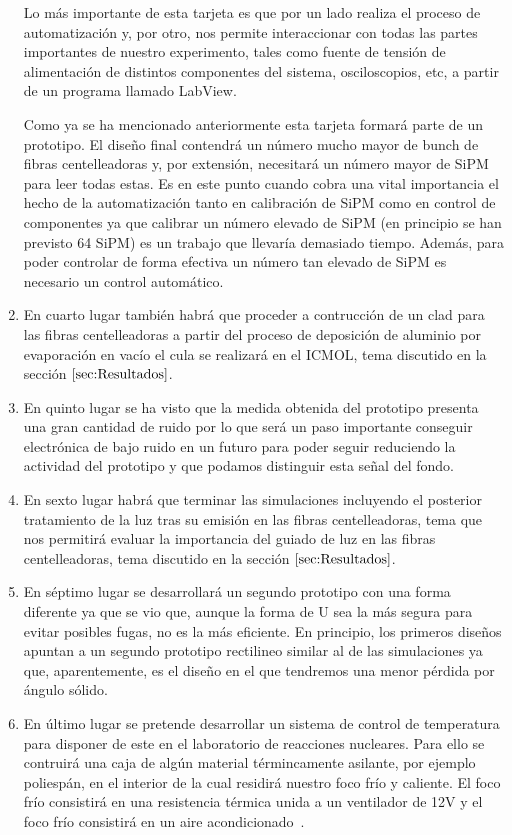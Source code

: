 \begin{enumerate}
Lo más importante de esta tarjeta es que por un lado realiza el proceso de automatización y, por otro, nos permite interaccionar con todas las partes importantes de nuestro experimento, tales como fuente de tensión de alimentación de distintos componentes del sistema, osciloscopios, etc, a partir de un programa llamado LabView.

Como ya se ha mencionado anteriormente esta tarjeta formará parte de un prototipo. El diseño final contendrá un número mucho mayor de bunch de fibras centelleadoras y, por extensión, necesitará un número mayor de SiPM para leer todas estas. Es en este punto cuando cobra una vital importancia el hecho de la automatización tanto en calibración de SiPM como en control de componentes ya que calibrar un número elevado de SiPM (en principio se han previsto 64 SiPM) es un trabajo que llevaría demasiado tiempo. Además, para poder controlar de forma efectiva un número tan elevado de SiPM es necesario un control automático. 

\item {} En cuarto lugar también habrá que proceder a contrucción de un clad para las fibras centelleadoras a partir del proceso de deposición de aluminio por evaporación en vacío el cula se realizará en el ICMOL, tema discutido en la sección $\ref{sec:Resultados}$.

\item {} En quinto lugar se ha visto que la medida obtenida del prototipo presenta una gran cantidad de ruido por lo que será un paso importante conseguir electrónica de bajo ruido en un futuro para poder seguir reduciendo la actividad del prototipo y que podamos distinguir esta señal del fondo.

\item {} En sexto lugar habrá que terminar las simulaciones incluyendo el posterior tratamiento de la luz tras su emisión en las fibras centelleadoras, tema que nos permitirá evaluar la importancia del guiado de luz en las fibras centelleadoras, tema discutido en la sección $\ref{sec:Resultados}$.

\item {} En séptimo lugar se desarrollará un segundo prototipo con una forma diferente ya que se vio que, aunque la forma de U sea la más segura para evitar posibles fugas, no es la más eficiente. En principio, los primeros diseños apuntan a un segundo prototipo rectilineo similar al de las simulaciones ya que, aparentemente, es el diseño en el que tendremos una menor pérdida por ángulo sólido.

\item {} En último lugar se pretende desarrollar un sistema de control de temperatura para disponer de este en el laboratorio de reacciones nucleares. Para ello se contruirá una caja de algún material términcamente asilante, por ejemplo poliespán, en el interior de la cual residirá nuestro foco frío y caliente. El foco frío consistirá en una resistencia térmica unida  a un ventilador de 12V y el foco frío consistirá en un aire acondicionado~\cite{Camara}.

\end{enumerate}